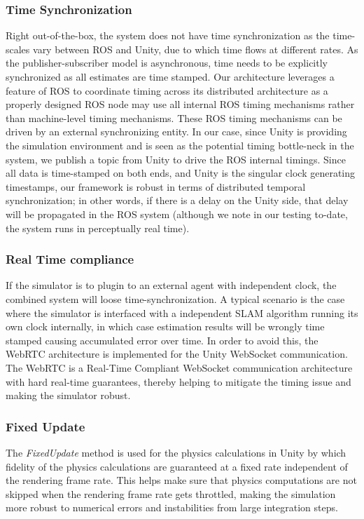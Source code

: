 \documentclass[a4paper, 10pt, conference]{ieeeconf}      %
\begin{document}
\subsubsection{Time Synchronization}
Right  out-of-the-box, the system does not have time synchronization as the time-scales vary between ROS and Unity, due to which time flows at different rates. As the publisher-subscriber model is asynchronous, time needs to be explicitly synchronized as all estimates are time stamped. Our architecture leverages a feature of ROS to coordinate timing across its distributed architecture as a properly designed ROS node may use all internal ROS timing mechanisms rather than machine-level timing mechanisms. These ROS timing mechanisms can be driven by an external synchronizing entity. In our case, since Unity is providing the simulation environment and is seen as the potential timing bottle-neck in the system, we publish a topic from Unity to drive the ROS internal timings. Since all data is time-stamped on both ends, and Unity is the singular clock generating timestamps, our framework is robust in terms of distributed temporal synchronization; in other words, if there is a delay on the Unity side, that delay will be propagated in the ROS system (although we note in our testing to-date, the system runs in perceptually real time).
\subsubsection{Real Time compliance}
If the simulator is to plugin to an external agent with independent clock, the combined system will loose time-synchronization. A typical scenario is the case where the simulator is interfaced with a independent SLAM algorithm running its own clock internally, in which case estimation results will be wrongly time stamped causing accumulated error over time. In order to avoid this, the WebRTC architecture\cite{loreto2014real} is implemented for the Unity WebSocket communication. The WebRTC is a Real-Time Compliant WebSocket communication architecture with hard real-time guarantees, thereby helping to mitigate the timing issue  and making the simulator robust. 
\subsubsection{Fixed Update}
The \textit{FixedUpdate} method is used for the physics calculations in Unity by which fidelity of the physics calculations are guaranteed at a fixed rate independent of the rendering frame rate. This helps make sure that physics computations are not skipped when the rendering frame rate gets throttled, making the simulation more robust to numerical errors and instabilities from large integration steps.
\end{document}
